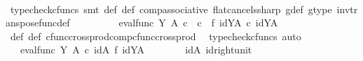 \begin{isabellebody}
\ \ \ \ \ \ \isamarkupfalse%
\ {\isacharparenleft}{\kern0pt}typecheck{\isacharunderscore}{\kern0pt}cfuncs{\isacharcomma}{\kern0pt}\ smt\ {\isasymphi}{\isacharunderscore}{\kern0pt}def\ {\isasympsi}{\isacharunderscore}{\kern0pt}def\ comp{\isacharunderscore}{\kern0pt}associative{}\ flat{\isacharunderscore}{\kern0pt}cancels{\isacharunderscore}{\kern0pt}sharp\ g{\isacharunderscore}{\kern0pt}def\ g{\isacharunderscore}{\kern0pt}type\ inv{\isacharunderscore}{\kern0pt}transpose{\isacharunderscore}{\kern0pt}func{\isacharunderscore}{\kern0pt}def{}{\isacharparenright}{\kern0pt}\isanewline
\ \ \ \ \isamarkupfalse%
\ \isamarkupfalse%
\ {\isachardoublequoteopen}{\isachardot}{\kern0pt}{\isachardot}{\kern0pt}{\isachardot}{\kern0pt}\ {\isacharequal}{\kern0pt}\ eval{\isacharunderscore}{\kern0pt}func\ Y\ A\ {\isasymcirc}\isactrlsub c\ {\isacharparenleft}{\kern0pt}{\isacharparenleft}{\kern0pt}{\isasymphi}\ {\isasymcirc}\isactrlsub c\ {\isasympsi}{\isacharparenright}{\kern0pt}\ {\isasymtimes}\isactrlsub f\ {\isacharparenleft}{\kern0pt}id{\isacharparenleft}{\kern0pt}Y\isactrlbsup A\isactrlesup {\isacharparenright}{\kern0pt}\ {\isasymcirc}\isactrlsub c\ id{\isacharparenleft}{\kern0pt}Y\isactrlbsup A\isactrlesup {\isacharparenright}{\kern0pt}{\isacharparenright}{\kern0pt}{\isacharparenright}{\kern0pt}{\isachardoublequoteclose}\isanewline
\ \ \ \ \ \ \isamarkupfalse%
\ {\isasymphi}{\isacharunderscore}{\kern0pt}def\ {\isasympsi}{\isacharunderscore}{\kern0pt}def\ cfunc{\isacharunderscore}{\kern0pt}cross{\isacharunderscore}{\kern0pt}prod{\isacharunderscore}{\kern0pt}comp{\isacharunderscore}{\kern0pt}cfunc{\isacharunderscore}{\kern0pt}cross{\isacharunderscore}{\kern0pt}prod\ \isamarkupfalse%
\ {\isacharparenleft}{\kern0pt}typecheck{\isacharunderscore}{\kern0pt}cfuncs{\isacharcomma}{\kern0pt}\ auto{\isacharparenright}{\kern0pt}\isanewline
\ \ \ \ \isamarkupfalse%
\ \isamarkupfalse%
\ {\isachardoublequoteopen}{\isachardot}{\kern0pt}{\isachardot}{\kern0pt}{\isachardot}{\kern0pt}\ {\isacharequal}{\kern0pt}\ eval{\isacharunderscore}{\kern0pt}func\ Y\ A\ {\isasymcirc}\isactrlsub c\ id{\isacharparenleft}{\kern0pt}A{\isacharparenright}{\kern0pt}\ {\isasymtimes}\isactrlsub f\ id{\isacharparenleft}{\kern0pt}Y\isactrlbsup A\isactrlesup {\isacharparenright}{\kern0pt}{\isachardoublequoteclose}\isanewline
\ \ \ \ \ \ \isamarkupfalse%
\ idA\ id{\isacharunderscore}{\kern0pt}right{\isacharunderscore}{\kern0pt}unit{}\ \isamarkupfalse%

\end{isabellebody}
